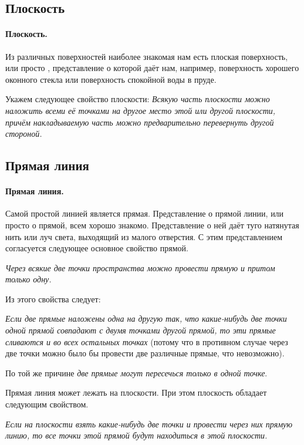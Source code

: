 \documentclass[oneside]{book}
\begin{document}
\subsection*{Плоскость}

\paragraph{Плоскость.}\label{1938/3}
Из различных поверхностей наиболее знакомая нам есть плоская поверхность, или просто , представление о которой даёт нам, например, поверхность хорошего оконного стекла или поверхность спокойной воды в пруде.

Укажем следующее свойство плоскости:
\textit{Всякую часть плоскости можно наложить всеми её точками на другое место этой или другой плоскости, причём накладываемую часть можно предварительно перевернуть другой стороной.}

\subsection*{Прямая линия}

\paragraph{Прямая линия.}\label{1938/4}
Самой простой линией является прямая.
Представление о прямой линии, или просто о прямой, всем хорошо знакомо.
Представление о ней даёт туго натянутая нить или луч света, выходящий из малого отверстия.
С этим представлением согласуется следующее основное свойство прямой.

\textit{Через всякие две точки пространства можно провести прямую и притом только одну.}

Из этого свойства следует:

\textit{Если две прямые наложены одна на другую так, что какие-нибудь две точки одной прямой совпадают с двумя точками другой прямой, то эти прямые сливаются и во всех остальных точках} (потому что в противном случае через две точки можно было бы провести две различные прямые, что невозможно).

По той же причине \textit{две прямые могут пересечься только в одной точке}.

Прямая линия может лежать на плоскости.
При этом плоскость обладает следующим свойством.

\textit{Если на плоскости взять какие-нибудь две точки и провести через них прямую линию, то все точки этой прямой будут находиться в этой плоскости.}
\end{document}
